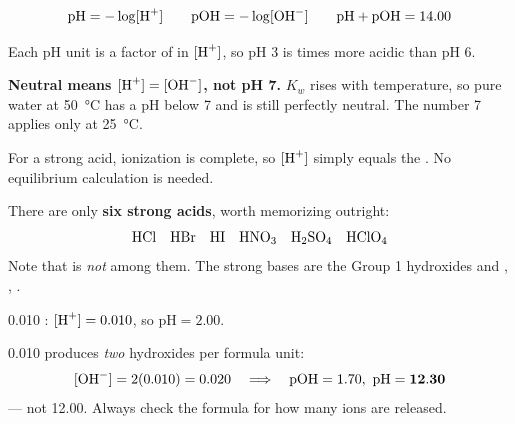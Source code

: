 \documentclass{apchem-notes}
\begin{document}


\[ \mathrm{pH} = -\log[\ce{H+}] \qquad
   \mathrm{pOH} = -\log[\ce{OH-}] \qquad
   \mathrm{pH} + \mathrm{pOH} = 14.00 \]

Each pH unit is a factor of  in $[\ce{H+}]$, so
pH 3 is  times more acidic than pH 6.

\begin{apctrap}
\textbf{Neutral means $[\ce{H+}] = [\ce{OH-}]$, not pH 7.} $K_w$ rises with
temperature, so pure water at \SI{50}{\celsius} has a pH below 7 and is
still perfectly neutral. The number 7 applies only at \SI{25}{\celsius}.
\end{apctrap}



For a strong acid, ionization is complete, so $[\ce{H+}]$ simply equals the
. No equilibrium calculation is
needed.

There are only \textbf{six strong acids}, worth memorizing outright:
\[ \ce{HCl} \quad \ce{HBr} \quad \ce{HI} \quad \ce{HNO3} \quad
   \ce{H2SO4} \quad \ce{HClO4} \]
Note that  is \emph{not} among them. The strong bases are the Group 1
hydroxides and , , .

\begin{workedexample}
\SI{0.010}{\Molar} : $[\ce{H+}] = 0.010$, so
$\mathrm{pH} = \mathbf{2.00}$.

\SI{0.010}{\Molar}  produces \emph{two} hydroxides per formula
unit:
\[ [\ce{OH-}] = 2(0.010) = 0.020 \quad\Longrightarrow\quad
   \mathrm{pOH} = 1.70,\ \mathrm{pH} = \mathbf{12.30} \]
--- not 12.00. Always check the formula for how many ions are released.
\end{workedexample}

\end{document}
